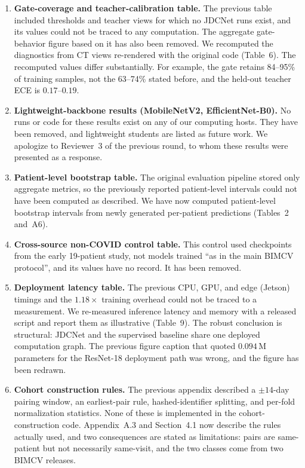 \documentclass[11pt]{article}
\begin{document}
\begin{enumerate}[leftmargin=1.6em]
  \item \textbf{Gate-coverage and teacher-calibration table.} The previous table included thresholds and teacher views for which no JDCNet runs exist, and its values could not be traced to any computation. The aggregate gate-behavior figure based on it has also been removed. We recomputed the diagnostics from CT views re-rendered with the original code (Table~6). The recomputed values differ substantially. For example, the gate retains 84--95\% of training samples, not the 63--74\% stated before, and the held-out teacher ECE is $0.17$--$0.19$.
  \item \textbf{Lightweight-backbone results (MobileNetV2, EfficientNet-B0).} No runs or code for these results exist on any of our computing hosts. They have been removed, and lightweight students are listed as future work. We apologize to Reviewer~3 of the previous round, to whom these results were presented as a response.
  \item \textbf{Patient-level bootstrap table.} The original evaluation pipeline stored only aggregate metrics, so the previously reported patient-level intervals could not have been computed as described. We have now computed patient-level bootstrap intervals from newly generated per-patient predictions (Tables~2 and~A6).
  \item \textbf{Cross-source non-COVID control table.} This control used checkpoints from the early 19-patient study, not models trained ``as in the main BIMCV protocol'', and its values have no record. It has been removed.
  \item \textbf{Deployment latency table.} The previous CPU, GPU, and edge (Jetson) timings and the $1.18\times$ training overhead could not be traced to a measurement. We re-measured inference latency and memory with a released script and report them as illustrative (Table~9). The robust conclusion is structural: JDCNet and the supervised baseline share one deployed computation graph. The previous figure caption that quoted $0.094$\,M parameters for the ResNet-18 deployment path was wrong, and the figure has been redrawn.
  \item \textbf{Cohort construction rules.} The previous appendix described a $\pm14$-day pairing window, an earliest-pair rule, hashed-identifier splitting, and per-fold normalization statistics. None of these is implemented in the cohort-construction code. Appendix~A.3 and Section~4.1 now describe the rules actually used, and two consequences are stated as limitations: pairs are same-patient but not necessarily same-visit, and the two classes come from two BIMCV releases.

\end{enumerate}
\end{document}
